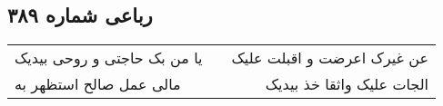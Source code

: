 \begin{center}
\section*{رباعی شماره ۳۸۹}
\label{sec:sh389}
\begin{longtable}{l p{0.5cm} r}
یا من بک حاجتی و روحی بیدیک
&&
عن غیرک اعرضت و اقبلت علیک
\\
مالی عمل صالح استظهر به
&&
الجات علیک واثقا خذ بیدیک
\\
\end{longtable}
\end{center}

